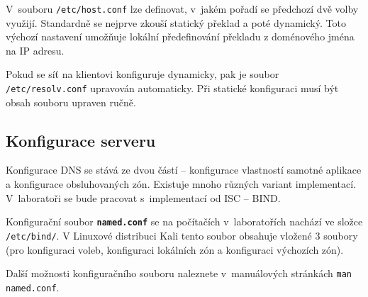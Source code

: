 V~souboru {\tt /etc/host.conf} lze definovat, v~jakém pořadí se předchozí dvě volby využijí. Standardně se nejprve zkouší statický překlad a poté dynamický. Toto výchozí nastavení umožňuje lokální předefinování překladu z doménového jména na IP adresu.

Pokud se síť na klientovi konfiguruje dynamicky, pak je soubor {\tt /etc/resolv.conf} upravován automaticky. Při statické konfiguraci musí být obsah souboru upraven ručně.

\subsection{Konfigurace serveru}
Konfigurace DNS se stává ze dvou částí -- konfigurace vlastností samotné aplikace a konfigurace obsluhovaných zón. Existuje mnoho různých variant implementací. V~laboratoři se bude pracovat s~implementací od ISC -- BIND.

Konfigurační soubor {\tt\bf named.conf} se na počítačích v~laboratořích nachází ve složce {\tt
/etc/bind/}. V Linuxové distribuci Kali tento soubor obsahuje vložené 3 soubory (pro konfiguraci voleb,
konfiguraci lokálních zón a konfiguraci výchozích zón).

%
%
%
%
%
%
%
%
%

Další možnosti konfiguračního souboru naleznete v~manuálových stránkách {\tt man named.conf}.

